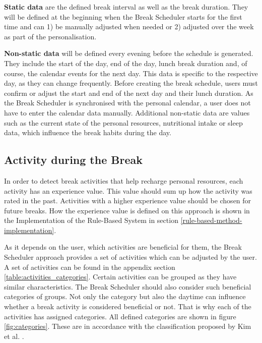 \documentclass{hasel_thesis}
\begin{document}
\textbf{Static data} are the defined break interval as well as the break duration. They will be defined at the beginning when the Break Scheduler starts for the first time and can 1) be manually adjusted when needed or 2) adjusted over the week as part of the personalisation.


\textbf{Non-static data} will be defined every evening before the schedule is generated. They include the start of the day, end of the day, lunch break duration and, of course, the calendar events for the next day. This data is specific to the respective day, as they can change frequently. Before creating the break schedule, users must confirm or adjust the start and end of the next day and their lunch duration. As the Break Scheduler is synchronised with the personal calendar, a user does not have to enter the calendar data manually. Additional non-static data are values such as the current state of the personal resources, nutritional intake or sleep data, which influence the break habits during the day.


\subsection{Activity during the Break}
In order to detect break activities that help recharge personal resources, each activity has an experience value. This value should sum up how the activity was rated in the past. Activities with a higher experience value should be chosen for future breaks. How the experience value is defined on this approach is shown in the Implementation of the Rule-Based System in section \ref{rule-based-method-implementation}. 

As it depends on the user, which activities are beneficial for them, the Break Scheduler approach provides a set of activities which can be adjusted by the user. A set of activities can be found in the appendix section \ref{table:activities_categories}. Certain activities can be grouped as they have similar characteristics. The Break Scheduler should also consider such beneficial categories of groups. Not only the category but also the daytime can influence whether a break activity is considered beneficial or not. That is why each of the activities has assigned categories. All defined categories are shown in figure \ref{fig:categories}. These are in accordance with the classification proposed by Kim et al. \cite{KimS.ParkY.&Niu.2017}.
\end{document}

